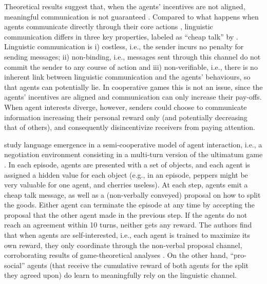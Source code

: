 Theoretical results suggest that,
when the agents' incentives are not aligned, meaningful communication
is not guaranteed \cite{Farrell:Rabin:1996}. Compared to what happens when agents
communicate directly through their core actions \cite<as in>{Mordatch:Abbeel:2018}, linguistic communication differs in
three key properties,  labeled  as ``cheap talk'' by
. Linguistic communication
is i) costless, i.e., the sender incurs no penalty for sending
messages; ii) non-binding, i.e., messages sent through this channel do
not commit the sender to any course of action and iii) non-verifiable,
i.e., there is no inherent link between linguistic communication and
the agents' behaviours, so that agents can potentially lie. %
In cooperative games this is not an issue, since the agents' incentives are aligned and communication can only increase their pay-offs. When agent interests diverge, however, senders could choose to communicate information increasing their personal reward only (and potentially decreasing that of others), and consequently disincentivize receivers from paying attention.

 study language emergence in a
semi-cooperative model of agent interaction, i.e., a negotiation
environment \cite{DeVault:etal:2015} consisting in a multi-turn
version of the ultimatum game \cite{Guth:etal:1982}. In each episode,
agents are presented with a set of objects, and each agent is
assigned a hidden value for each object (e.g., in an episode, peppers
might be very valuable for one agent, and cherries useless).  At each
step, agents emit a cheap talk message, as well as a (non-verbally
conveyed) proposal on how to split the goods. Either agent can
terminate the episode at any time by accepting the proposal that the
other agent made in the previous step. If the agents do not reach an
agreement within 10 turns, neither gets any reward. The authors find
that when agents are self-interested, i.e., each agent is trained to
maximize its own reward, they only coordinate through the non-verbal
proposal channel, corroborating results of 
game-theoretical analyses \cite{Crawford:Sobel:1982}. On the other
hand, ``pro-social'' agents (that receive the
cumulative reward of both agents for the split they agreed upon) do
learn to meaningfully rely on the linguistic channel.

